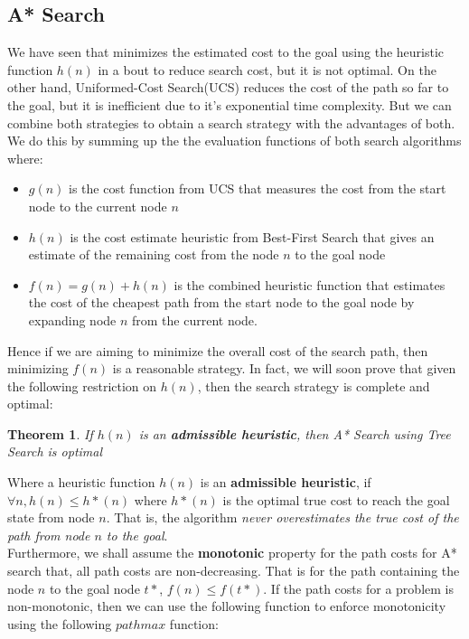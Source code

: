 \documentclass[12pt]{article}
\newtheorem{theorem}{Theorem}
\begin{document}
\subsection{A* Search}

We have seen that minimizes the estimated cost to the goal using the heuristic function $h(n)$ in a bout to reduce search cost, but it is not optimal. On the other hand, Uniformed-Cost Search(UCS) reduces the cost of the path so far to the goal, but it is inefficient due to it's exponential time complexity. But we can combine both strategies to obtain a search strategy with the advantages of both. We do this by summing up the the evaluation functions of both search algorithms where:

\begin{itemize}
\item $g(n)$ is the cost function from UCS that measures the cost from the start node to the current node $n$
\item $h(n)$ is the cost estimate heuristic from Best-First Search that gives an estimate of the remaining cost from the node $n$ to the goal node
\item $f(n) = g(n) + h(n)$ is the combined heuristic function that estimates the cost of the cheapest path from the start node to the goal node by expanding node $n$ from the current node.
\end{itemize}

Hence if we are aiming to minimize the overall cost of the search path, then minimizing $f(n)$ is a reasonable strategy. In fact, we will soon prove that given the following restriction on $h(n)$, then the search strategy is complete and optimal:

\begin{theorem}
If $h(n)$ is an \textbf{admissible heuristic}, then A* Search using Tree Search is optimal
\end{theorem}

Where a heuristic function $h(n)$ is an \textbf{admissible heuristic}, if $\forall n, h(n) \leq h*(n)$ where $h*(n)$ is the optimal true cost to reach the goal state from node $n$. That is, the algorithm \textit{never overestimates the true cost of the path from node $n$ to the goal}.\\

Furthermore, we shall assume the \textbf{monotonic} property for the path costs for A* search that, all path costs are non-decreasing. That is for the path containing the node $n$ to the goal node $t*$, $f(n) \leq f(t*)$. If the path costs for a problem is non-monotonic, then we can use the following function to enforce monotonicity using the following $pathmax$ function:
\end{document}
